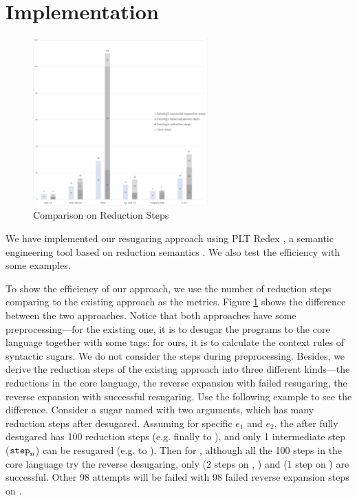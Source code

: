 \section{Implementation}
\label{sec:implementation}




\begin{figure}[t]
	\centering
	\includegraphics[width=0.6\textwidth]{images/efficiency.png}
	\caption{Comparison on Reduction Steps}
	\label{fig:step}
\end{figure}
We have implemented our resugaring approach using PLT Redex \cite{SEwPR}, a semantic engineering tool based on reduction semantics \cite{reduction}. We also test the efficiency with some examples.

To show the efficiency of our approach, we use the number of reduction steps comparing to the existing approach as the metrics. Figure \ref{fig:step} shows the difference between the two approaches. Notice that both approaches have some preprocessing---for the existing one, it is to desugar the programs to the core language together with some tags; for ours, it is to calculate the context rules of syntactic sugars. We do not consider the steps during preprocessing. Besides, we derive the reduction steps of the existing approach into three different kinds---the reductions in the core language, the reverse expansion with failed resugaring, the reverse expansion with successful resugaring.  Use the following example to see the difference. Consider a sugar named  with two arguments, which has many reduction steps after desugared. Assuming for specific $e_1$ and $e_2$, the  after fully desugared has 100 reduction steps (e.g. finally to \m{\false}), and only 1 intermediate step ($\mbox{\tt step}_n$) can be resugared (e.g. to ). Then for , although all the 100 steps in the core language try the reverse desugaring, only  (2 steps on , ) and  (1 step on ) are successful. Other 98 attempts will be failed with 98 failed reverse expansion steps on .

